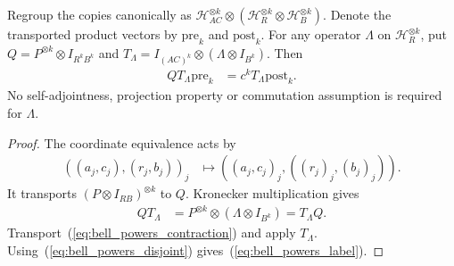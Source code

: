 \begin{theorem}
\label{thm:typical_bell_powers_label}
\leanok
{}
Regroup the copies canonically as
$\mathcal H_{AC}^{\otimes k}\otimes
(\mathcal H_R^{\otimes k}\otimes\mathcal H_B^{\otimes k})$.
Denote the transported product vectors by $\mathrm{pre}_k$ and
$\mathrm{post}_k$. For any operator $\Lambda$ on
$\mathcal H_R^{\otimes k}$, put
$Q=P^{\otimes k}\otimes I_{R^kB^k}$ and
$T_\Lambda=I_{(AC)^k}\otimes(\Lambda\otimes I_{B^k})$. Then
\begin{align}
 Q T_\Lambda\mathrm{pre}_k
   &=c^kT_\Lambda\mathrm{post}_k.
 \label{eq:bell_powers_label}
\end{align}
No self-adjointness, projection property or commutation assumption is
required for $\Lambda$.
\end{theorem}
\begin{proof}
\leanok
{}
The coordinate equivalence acts by
\begin{align}
 ((a_j,c_j),(r_j,b_j))_j
   &\longmapsto ((a_j,c_j)_j,((r_j)_j,(b_j)_j)).
 \label{eq:bell_powers_coordinates}
\end{align}
It transports $(P\otimes I_{RB})^{\otimes k}$ to $Q$.
Kronecker multiplication gives
\begin{align}
 Q T_\Lambda&=P^{\otimes k}\otimes(\Lambda\otimes I_{B^k})=T_\Lambda Q.
 \label{eq:bell_powers_disjoint}
\end{align}
Transport~(\ref{eq:bell_powers_contraction}) and apply $T_\Lambda$.
Using~(\ref{eq:bell_powers_disjoint}) gives~(\ref{eq:bell_powers_label}).
\end{proof}
